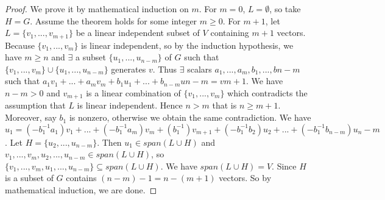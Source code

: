 \begin{proof}
	We prove it by mathematical induction on $m$. For $m=0$, $L = \emptyset$, so take $H=G$. Assume the theorem holds for some integer $m \geq 0$. For $ m+1 $, let $L = \{ v_1,...,v_{m+1} \}$ be a linear independent subset of $V$ containing $m+1$ vectors. Because $\{v_1,...,v_m\}$ is linear independent, so by the induction  hypothesis, we have $m \geq n$ and $\exists$ a subset $\{u_1,...,u_{n-m}\}$ of $G$ such that $\{v_1,...,v_m\} \cup \{u_1,...,u_{n-m}\}$  generates $v$. Thus $\exists$ scalars $a_1,...,a_m,b_1,...,b{n-m}$ such that $a_1v_1+...+a_mv_m+b_1u_1+...+b_{n-m}u{n-m}=v{m+1}$. We have $n-m>0$ and $v_{m+1}$ is a linear combination of $\{v_1,...,v_m\}$ which contradicts the assumption that $L$ is linear independent. Hence $n>m$ that is $n \geq m+1$. Moreover, say $b_1$ is nonzero, otherwise we obtain the same contradiction. We have $u_1 = (-b_1^{-1}a_1)v_1+...+(-b_1^{-1}a_m)v_m+(b_1^{-1})v_{m+1}+(-b_1^{-1}b_2)u_2+...+(-b_1^{-1}b_{n-m})u_n-m$. Let $H = \{u_2,...,u_{n-m}\}$. Then $u_1 \in span(L \cup H)$ and $v_1,...,v_m,u_2,...,u_{n-m} \in span(L \cup H)$, so $ \{v_1,...,v_m,u_1,...,u_{n-m} \} \subseteq span(L \cup H)$.  We have $span(L \cup H)=V$. Since $H$ is a subset of $G$  contains $(n-m)-1=n-(m+1)$ vectors. So by mathematical induction, we are done.
\end{proof}